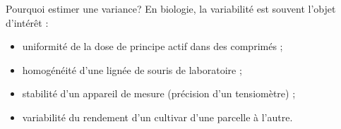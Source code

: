 \documentclass{BeamerTemplate}
\begin{document}
\begin{frame}[t]{Pourquoi estimer une variance?}
  En biologie, la \alert{variabilité} est souvent l'objet d'intérêt :
  \begin{itemize}\itemsep 2mm
    \item uniformité de la dose de principe actif dans des comprimés ;
    \item homogénéité d'une lignée de souris de laboratoire ;
    \item stabilité d'un appareil de mesure (précision d'un tensiomètre) ;
    \item variabilité du rendement d'un cultivar d'une parcelle à l'autre.
  \end{itemize}

  \medskip
\end{frame}
\end{document}
